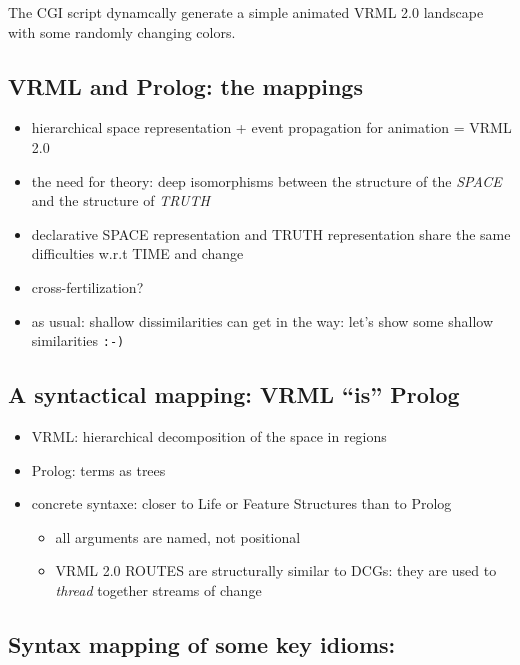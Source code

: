\documentclass{article}
\begin{document}
The CGI script dynamcally generate a simple animated VRML 2.0 
landscape with some randomly changing colors.

\subsection{VRML and Prolog: the mappings}

\begin{itemize}
\item  hierarchical space representation + event propagation for animation = VRML 2.0

\item the need for theory: deep isomorphisms between the structure of the
 {\em  SPACE} and the structure of {\em  TRUTH}

\item declarative SPACE representation and TRUTH representation
share the same difficulties w.r.t TIME and change

\item cross-fertilization?
\item as usual: shallow dissimilarities can get in the way:
let's show some shallow similarities \verb~:-)~
\end{itemize}


\subsection{A syntactical mapping: VRML ``is'' Prolog}

\begin{itemize}
\item VRML: hierarchical decomposition of the space in regions
\item Prolog: terms as trees
\item concrete syntaxe: closer to Life or Feature Structures than to Prolog
\begin{itemize}
\item all arguments are named, not positional
\item VRML 2.0 ROUTES are structurally similar to DCGs:
   they are used to {\em  thread} together streams of change
\end{itemize}
\end{itemize}

\subsection{Syntax mapping of some key idioms:}
\end{document}
